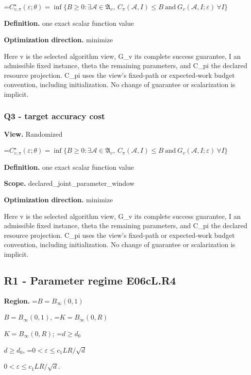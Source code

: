 \documentclass[10pt,a4paper]{article}
\newcommand{\AtlasMath}[1]{\par\begingroup\centering\setbox0=\hbox{$\displaystyle #1$}\ifdim\wd0>1.4\linewidth\typeout{ATLAS WIDE FORMULA: \the\wd0}\fi\ifdim\wd0>\linewidth\resizebox{\linewidth}{!}{\box0}\else\box0\fi\par\endgroup}
\newcommand{\AtlasInlineMath}[1]{\begingroup\setbox0=\hbox{$#1$}\ifdim\wd0>.4\linewidth\endgroup\AtlasMath{#1}\else\endgroup$#1$\fi}
\begin{document}
\AtlasMath{C^\star_{v,\pi}(\varepsilon;\theta)=\inf\{B\ge0:\exists\mathcal A\in\mathfrak A_v,\ C_\pi(\mathcal A,I)\le B\ \text{and}\ G_v(\mathcal A,I;\varepsilon)\ \forall I\}}


\textbf{Definition.} one exact scalar function value



\textbf{Optimization direction.} minimize



Here v is the selected algorithm view, G\_v its complete success guarantee, I an admissible fixed instance, theta the remaining parameters, and C\_pi the declared resource projection. C\_pi uses the view's fixed-path or expected-work budget convention, including initialization. No change of guarantee or scalarization is implicit.



\subsubsection{Q3 - target accuracy cost}


\textbf{View.} Randomized



\AtlasMath{C^\star_{v,\pi}(\varepsilon;\theta)=\inf\{B\ge0:\exists\mathcal A\in\mathfrak A_v,\ C_\pi(\mathcal A,I)\le B\ \text{and}\ G_v(\mathcal A,I;\varepsilon)\ \forall I\}}


\textbf{Definition.} one exact scalar function value



\textbf{Scope.} declared\_joint\_parameter\_window



\textbf{Optimization direction.} minimize



Here v is the selected algorithm view, G\_v its complete success guarantee, I an admissible fixed instance, theta the remaining parameters, and C\_pi the declared resource projection. C\_pi uses the view's fixed-path or expected-work budget convention, including initialization. No change of guarantee or scalarization is implicit.



\subsection{R1 - Parameter regime E06cL.R4}


\textbf{Region.} \AtlasInlineMath{B=B_\infty(0,1)}, \AtlasInlineMath{K=B_\infty(0,R)}; \AtlasInlineMath{d\ge d_0}, \AtlasInlineMath{0<\varepsilon\le c_1LR/\sqrt d}.
\end{document}
